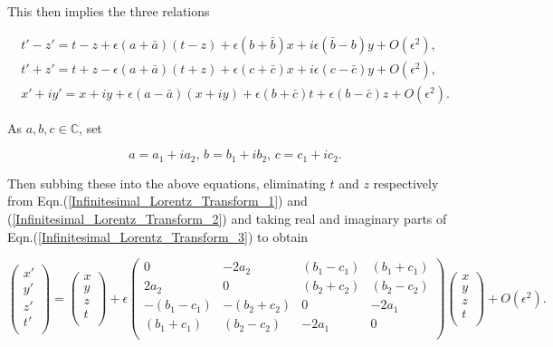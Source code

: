 \noindent This then implies the three relations

\begin{eqnarray}\label{Infinitesimal_Lorentz_Transform_1}
t'-z' = t-z + \epsilon(a + \bar{a})(t-z) + \epsilon(b + \bar{b})x + i\epsilon(\bar{b} - b)y + O(\epsilon^2), \\\label{Infinitesimal_Lorentz_Transform_2}
t'+z' = t+ z - \epsilon(a + \bar{a})(t+z) + \epsilon (c + \bar{c})x + i \epsilon(c-\bar{c})y + O(\epsilon^2), \\\label{Infinitesimal_Lorentz_Transform_3}
x'+iy' = x+iy + \epsilon(a-\bar{a})(x+iy) + \epsilon(b + \bar{c})t + \epsilon (b-\bar{c})z + O(\epsilon^2).
\end{eqnarray}

\noindent As $a,b,c \in \mathbb{C}$, set 

\begin{equation*}
a = a_1 +ia_2 \text{,  } b = b_1 +ib_2 \text{,  } c = c_1 +ic_2 \text{.} 
\end{equation*}

\noindent Then subbing these into the above equations, eliminating $t$ and $z$ respectively from Eqn.(\ref{Infinitesimal_Lorentz_Transform_1}) and (\ref{Infinitesimal_Lorentz_Transform_2}) and taking real and imaginary parts of Eqn.(\ref{Infinitesimal_Lorentz_Transform_3}) to obtain

\begin{equation}\label{infinitesimal_Matrix_component_wise}
\left(
\begin{array}{c}
x' \\
y'\\
z'\\
t'\\
\end{array}
\right)
=
\left(
\begin{array}{c}
x \\
y\\
z\\
t\\
\end{array}
\right)
+ \epsilon
\left(
\begin{array}{cccc}
0            & -2a_2        & (b_1 - c_1) & (b_1+c_1)\\
2a_2         & 0            & (b_2+c_2)   & (b_2 - c_2) \\
-(b_1 - c_1) & -(b_2 + c_2) & 0           & -2a_1 \\
(b_1 + c_1)  & (b_2-c_2)    & -2a_1       & 0 \\
\end{array}
\right)
\left(
\begin{array}{c}
x \\
y\\
z\\
t\\
\end{array}
\right)
+ O(\epsilon^2).
\end{equation}

